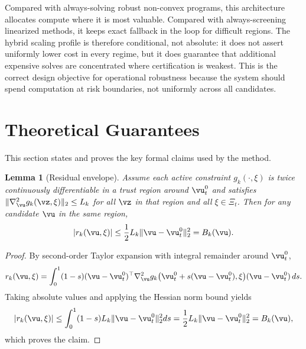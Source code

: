 \documentclass{article} %
\newtheorem{lemma}[theorem]{Lemma}
\begin{document}
Compared with always-solving robust non-convex programs, this architecture allocates compute where it is most valuable. Compared with always-screening linearized methods, it keeps exact fallback in the loop for difficult regions. The hybrid scaling profile is therefore conditional, not absolute: it does not assert uniformly lower cost in every regime, but it does guarantee that additional expensive solves are concentrated where certification is weakest. This is the correct design objective for operational robustness because the system should spend computation at risk boundaries, not uniformly across all candidates.

\section{Theoretical Guarantees}
\label{sec:theory}
This section states and proves the key formal claims used by the method.

\begin{lemma}[Residual envelope]
\label{lem:residual}
Assume each active constraint $g_k(\cdot,\xi)$ is twice continuously differentiable in a trust region around $\vu_t^0$ and satisfies $\|\nabla^2_{\vu}g_k(\vz,\xi)\|_2\le L_k$ for all $\vz$ in that region and all $\xi\in\Xi_t$. Then for any candidate $\vu$ in the same region,
\[
|r_k(\vu,\xi)|\le \frac{1}{2}L_k\|\vu-\vu_t^0\|_2^2=B_k(\vu).
\]
\end{lemma}
\begin{proof}
By second-order Taylor expansion with integral remainder around $\vu_t^0$,
\[
r_k(\vu,\xi)=\int_0^1 (1-s)(\vu-\vu_t^0)^\top\nabla^2_{\vu}g_k\big(\vu_t^0+s(\vu-\vu_t^0),\xi\big)(\vu-\vu_t^0)\,ds.
\]
Taking absolute values and applying the Hessian norm bound yields
\[
|r_k(\vu,\xi)|\le\int_0^1(1-s)L_k\|\vu-\vu_t^0\|_2^2ds=\frac{1}{2}L_k\|\vu-\vu_t^0\|_2^2=B_k(\vu),
\]
which proves the claim.
\end{proof}
\end{document}
